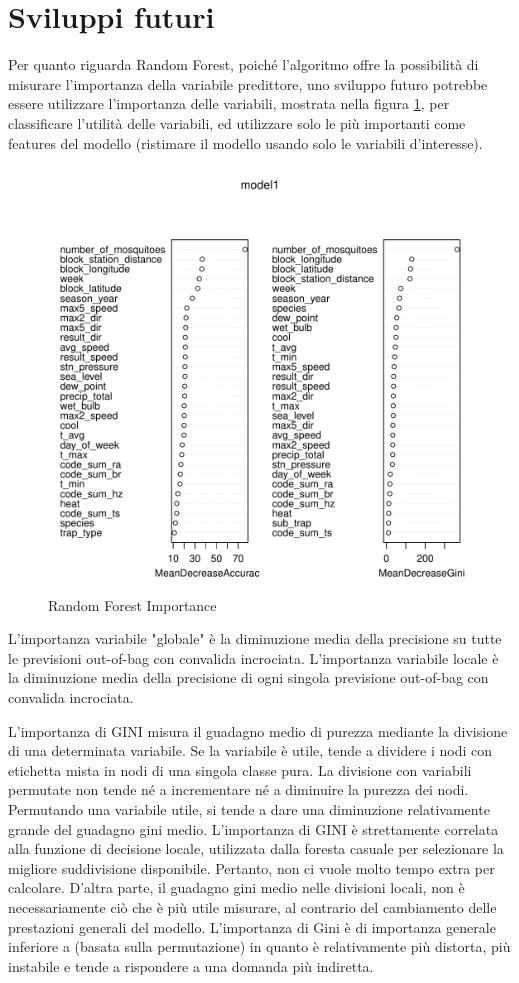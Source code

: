 \section{Sviluppi futuri}

Per quanto riguarda Random Forest, poiché l'algoritmo offre la possibilità di 
misurare l’importanza della variabile predittore, uno sviluppo futuro potrebbe 
essere utilizzare l'importanza delle variabili, mostrata nella figura 
\ref{fig:rf_importance}, per classificare l'utilità delle variabili, ed 
utilizzare solo le più importanti come features del modello (ristimare il 
modello usando solo le variabili d’interesse). 

\begin{figure}[H]
	\centering
	\includegraphics[width=0.7\columnwidth]{images/ml/random_forest/HoldoutRF/model_importance}
	\caption{Random Forest Importance}
	\label{fig:rf_importance}
\end{figure}

L'importanza variabile "globale" è la diminuzione media della precisione su 
tutte le previsioni out-of-bag con convalida incrociata. 
L'importanza variabile locale è la diminuzione media della precisione 
di ogni singola previsione out-of-bag con convalida incrociata. 

L'importanza di GINI misura il guadagno medio di purezza mediante la 
divisione di una determinata variabile. Se la variabile è utile, tende a 
dividere i nodi con etichetta mista in nodi di una singola classe pura. La 
divisione con variabili permutate non tende né a incrementare né a diminuire la 
purezza dei nodi. 
Permutando una variabile utile, si tende a dare una diminuzione relativamente 
grande del guadagno gini medio. L'importanza di GINI è strettamente correlata 
alla funzione di decisione locale, utilizzata dalla foresta casuale per 
selezionare la migliore suddivisione disponibile. Pertanto, non ci vuole molto 
tempo extra per calcolare. D'altra parte, il guadagno gini medio nelle 
divisioni locali, non è necessariamente ciò che è più utile misurare, al 
contrario del cambiamento delle prestazioni generali del modello. 
L'importanza di Gini è di importanza generale inferiore a (basata sulla 
permutazione) in quanto è relativamente più distorta, più instabile e tende a 
rispondere a una domanda più indiretta.
